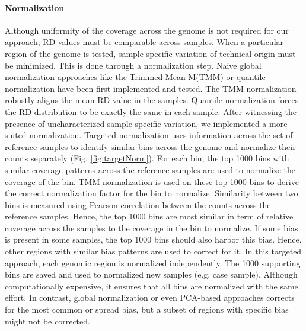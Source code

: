 \paragraph{Normalization}
Although uniformity of the coverage across the genome is not required for our approach, RD values must be comparable across samples. When a particular region of the genome is tested, sample specific variation of technical origin must be minimized. This is done through a normalization step.
Naive global normalization approaches like the Trimmed-Mean M(TMM) or quantile normalization have been first implemented and tested. The TMM normalization robustly aligns the mean RD value in the samples. Quantile normalization forces the RD distribution to be exactly the same in each sample. After witnessing the presence of uncharacterized sample-specific variation, we implemented a more suited normalization.
Targeted normalization uses information across the set of reference samples to identify similar bins across the genome and normalize their counts separately (Fig. \ref{fig:targetNorm}). For each bin, the top 1000 bins with similar coverage patterns across the reference samples are used to normalize the coverage of the bin. TMM normalization is used on these top 1000 bins to derive the correct normalization factor for the bin to normalize. Similarity between two bins is measured using Pearson correlation between the counts across the reference samples. Hence, the top 1000 bins are most similar in term of relative coverage across the samples to the coverage in the bin to normalize. If some bias is present in some samples, the top 1000 bins should also harbor this bias. Hence, other regions with similar bias patterns are used to correct for it. In this targeted approach, each genomic region is normalized independently. The 1000 supporting bins are saved and used to normalized new samples (e.g. case sample). Although computationally expensive, it ensures that all bins are normalized with the same effort. In contrast, global normalization or even PCA-based approaches corrects for the most common or spread bias, but a subset of regions with specific bias might not be corrected.

